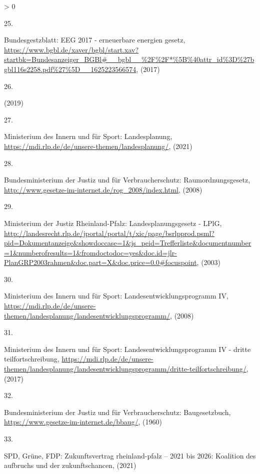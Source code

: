 \documentclass[a4paper,11pt]{article}
\newlength{\cslhangindent}
\newlength{\csllabelwidth}
\newenvironment{CSLReferences}[3] %
 {%
  \setlength{\parindent}{0pt}
  \ifodd #1 \everypar{\setlength{\hangindent}{\cslhangindent}}\ignorespaces\fi
  \ifnum #2 > 0
  \setlength{\parskip}{#2\baselineskip}
  \fi
 }%
 {}
\newcommand{\CSLLeftMargin}[1]{\parbox[t]{\maxof{\widthof{#1}}{\csllabelwidth}}{#1}}
\newcommand{\CSLRightInline}[1]{\parbox[t]{\linewidth}{#1}}
\begin{document}
\begin{CSLReferences}{0}{0}
\leavevmode\hypertarget{ref-Bundesgestzblatt.2017}{}%
\CSLLeftMargin{25. }
\CSLRightInline{Bundesgestzblatt: EEG 2017 - erneuerbare energien gesetz, \url{https://www.bgbl.de/xaver/bgbl/start.xav?startbk=Bundesanzeiger_BGBl\#__bgbl__\%2F\%2F*\%5B\%40attr_id\%3D\%27bgbl116s2258.pdf\%27\%5D__1625223566574}, (2017)}

\leavevmode\hypertarget{ref-EnergieagenturRheinlandPfalz.2019}{}%
\CSLLeftMargin{26. }
\CSLRightInline{(2019)}

\leavevmode\hypertarget{ref-MinisteriumdesInnernundfurSport.2021}{}%
\CSLLeftMargin{27. }
\CSLRightInline{Ministerium des Innern und für Sport: Landesplanung, \url{https://mdi.rlp.de/de/unsere-themen/landesplanung/}, (2021)}

\leavevmode\hypertarget{ref-BundesministeriumderJustizundfurVerbraucherschutz.2008}{}%
\CSLLeftMargin{28. }
\CSLRightInline{Bundesministerium der Justiz und für Verbraucherschutz: Raumordnungsgesetz, \url{http://www.gesetze-im-internet.de/rog_2008/index.html}, (2008)}

\leavevmode\hypertarget{ref-MinisteriumderJustizRheinlandPfalz.2003}{}%
\CSLLeftMargin{29. }
\CSLRightInline{Ministerium der Justiz Rheinland-Pfalz: Landesplanungsgesetz - LPlG, \url{http://landesrecht.rlp.de/jportal/portal/t/xic/page/bsrlpprod.psml?pid=Dokumentanzeige\&showdoccase=1\&js_peid=Trefferliste\&documentnumber=1\&numberofresults=1\&fromdoctodoc=yes\&doc.id=jlr-PlanGRP2003rahmen\&doc.part=X\&doc.price=0.0\#focuspoint}, (2003)}

\leavevmode\hypertarget{ref-MinisteriumdesInnernundfurSport.2008}{}%
\CSLLeftMargin{30. }
\CSLRightInline{Ministerium des Innern und für Sport: Landesentwicklungsprogramm IV, \url{https://mdi.rlp.de/de/unsere-themen/landesplanung/landesentwicklungsprogramm/}, (2008)}

\leavevmode\hypertarget{ref-MinisteriumdesInnernundfurSport.2017}{}%
\CSLLeftMargin{31. }
\CSLRightInline{Ministerium des Innern und für Sport: Landesentwicklungsprogramm IV - dritte teilfortschreibung, \url{https://mdi.rlp.de/de/unsere-themen/landesplanung/landesentwicklungsprogramm/dritte-teilfortschreibung/}, (2017)}

\leavevmode\hypertarget{ref-BundesministeriumderJustizundfurVerbraucherschutz.1960}{}%
\CSLLeftMargin{32. }
\CSLRightInline{Bundesministerium der Justiz und für Verbraucherschutz: Baugesetzbuch, \url{https://www.gesetze-im-internet.de/bbaug/}, (1960)}

\leavevmode\hypertarget{ref-SPD.2021}{}%
\CSLLeftMargin{33. }
\CSLRightInline{SPD, Grüne, FDP: Zukunftsvertrag rheinland-pfalz -- 2021 bis 2026: Koalition des aufbruchs und der zukunftschancen, (2021)}


\end{CSLReferences}
\end{document}
